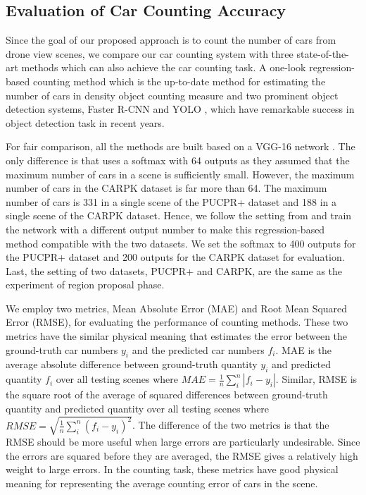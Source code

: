 \documentclass[10pt,twocolumn,letterpaper]{article}
\begin{document}
\subsection{Evaluation of Car Counting Accuracy}

Since the goal of our proposed approach is to count the number of cars from drone view scenes, we compare our car counting system with three state-of-the-art methods which can also achieve the car counting task. A one-look regression-based counting method \cite{04_mundhenk2016large} which is the up-to-date method for estimating the number of cars in density object counting measure and two prominent object detection systems, Faster R-CNN \cite{21_ren2015faster} and YOLO \cite{43_redmon2016you}, which have remarkable success in object detection task in recent years. 


For fair comparison, all the methods are built based on a VGG-16 network \cite{06_simonyan2014very}. The only difference is that \cite{04_mundhenk2016large} uses a softmax with 64 outputs as they assumed that the maximum number of cars in a scene is sufficiently small. However, the maximum number of cars in the CARPK dataset is far more than 64. The maximum number of cars is 331 in a single scene of the PUCPR+ dataset and 188 in a single scene of the CARPK dataset. Hence, we follow the setting from \cite{04_mundhenk2016large} and train the network with a different output number to make this regression-based method compatible with the two datasets. We set the softmax to 400 outputs for the PUCPR+ dataset and 200 outputs for the CARPK dataset for evaluation. Last, the setting of two datasets, PUCPR+ and CARPK, are the same as the experiment of region proposal phase. 


We employ two metrics, Mean Absolute Error (MAE) and Root Mean Squared Error (RMSE), for evaluating the performance of counting methods. These two metrics have the similar physical meaning that estimates the error between the ground-truth car numbers $y_{i}$ and the predicted car numbers $f_{i}$. MAE is the average absolute difference between ground-truth quantity $y_{i}$ and predicted quantity $f_{i}$ over all testing scenes where $MAE = \frac{1}{n} \sum_{i}^{n} |f_{i} - y_{i}|$. Similar, RMSE is the square root of the average of squared differences between ground-truth quantity and predicted quantity over all testing scenes where $RMSE =\sqrt{\frac{1}{n} \sum_{i}^{n} (f_{i} - y_{i})^{2}}$. The difference of the two metrics is that the RMSE should be more useful when large errors are particularly undesirable. Since the errors are squared before they are averaged, the RMSE gives a relatively high weight to large errors. In the counting task, these metrics have good physical meaning for representing the average counting error of cars in the scene.
\end{document}
